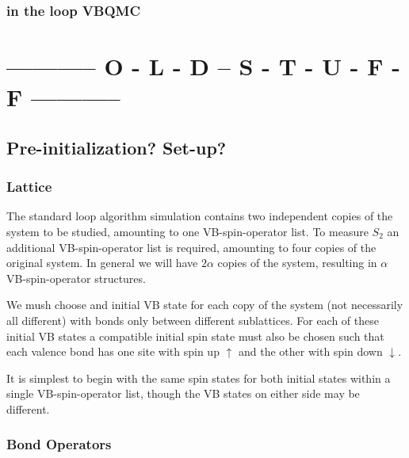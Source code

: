 \documentclass[prb,aps,twocolumn,floatfix,amsmath,amssymb,superscriptaddress,tightenlines]{revtex4}
\begin{document}
\subsubsection{in the loop VBQMC}

\section{----------- O - L - D -- S - T - U - F - F -----------}
\subsection{Pre-initialization? Set-up? }
 
\subsubsection{Lattice}
	
The standard loop algorithm simulation contains two independent copies of the system to be studied, amounting to one VB-spin-operator list. 
To measure $S_2$ an additional VB-spin-operator list is required, amounting to four copies of the original system.
In general we will have $2\alpha$ copies of the system, resulting in $\alpha$ VB-spin-operator structures.
	
We mush choose and initial VB state for each copy of the system (not necessarily all different) with bonds only between different sublattices. 
For each of these initial VB states a compatible initial spin state must also be chosen such that each valence bond has one site with spin up $\uparrow$ and the other with spin down $\downarrow$.

It is simplest to begin with the same spin states for both initial states within a single VB-spin-operator list, though the VB states on either side may be different.	
	
	
\subsubsection{Bond Operators}
\end{document}
